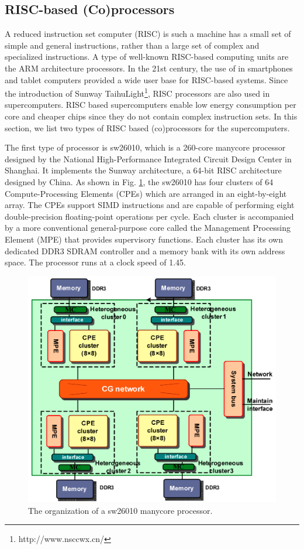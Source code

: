 \subsection{RISC-based (Co)processors}

A reduced instruction set computer (RISC)  is such a machine has a small set of simple and general instructions, rather than a large set of complex and specialized instructions. A type of well-known RISC-based computing units are the ARM architecture processors. In the 21st century, the use of in smartphones and tablet computers provided a wide user base for RISC-based systems. Since the introduction of Sunway TaihuLight\footnote{http://www.nsccwx.cn/}, RISC processors are also used in supercomputers. RISC based supercomputers enable low energy consumption per core and cheaper chips since they do not contain complex instruction sets. In this section, we list two types of RISC based (co)processors for the supercomputers.

The first type of processor is sw26010, which is a 260-core manycore processor \cite{fu2016sunway} designed by the National High-Performance Integrated Circuit Design Center in Shanghai. It implements the Sunway architecture, a 64-bit RISC architecture designed by China. As shown in Fig. \ref{fig:sw26010}, the sw26010 has four clusters of 64 Compute-Processing Elements (CPEs) which are arranged in an eight-by-eight array. The CPEs support SIMD instructions and are capable of performing eight double-precision floating-point operations per cycle. Each cluster is accompanied by a more conventional general-purpose core called the Management Processing Element (MPE) that provides supervisory functions. Each cluster has its own dedicated DDR3 SDRAM controller and a memory bank with its own address space. The processor runs at a clock speed of 1.45.

\begin{figure}[t]
	\centering
	\includegraphics[width=0.81\linewidth]{fig/sw26010.png}
	\caption{The organization of a sw26010 manycore processor.}
	\label{fig:sw26010}
\end{figure}

